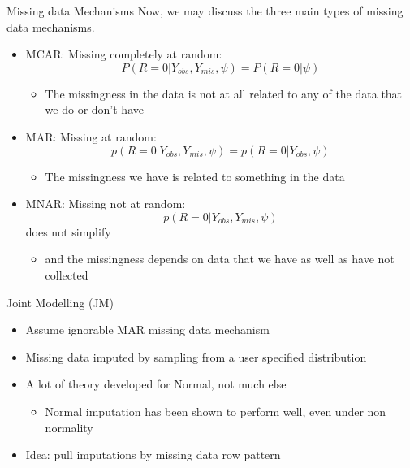 \begin{frame}{Missing data Mechanisms}
Now, we may discuss the three main types of missing data mechanisms. 
\begin{itemize}

\item MCAR: Missing completely at random:  $$P(R=0|Y_{obs},Y_{mis},\psi)=P(R=0|\psi)$$
\begin{itemize}
\item The missingness in the data is not at all related to any of the data that we do or don't have
\end{itemize}
\item MAR: Missing at random: $$p(R=0|Y_{obs},Y_{mis},\psi)= p(R=0|Y_{obs},\psi)$$
\begin{itemize}
 \item The missingness we have is related to something in the data 
\end{itemize}
\item MNAR: Missing not at random: $$p(R=0|Y_{obs},Y_{mis},\psi)$$ does not simplify
\begin{itemize}
 \item  and the missingness depends on data that we have as well as have not collected
\end{itemize}


\end{itemize}
 
\end{frame}

\begin{frame}{Joint Modelling (JM)}
 \begin{itemize}
  \item Assume ignorable MAR  missing data mechanism
  \item Missing data imputed by sampling from a user specified distribution
  \item A lot of theory developed for Normal, not much else
  \begin{itemize}
   \item Normal imputation has been shown to perform well, even under non normality \cite{Demirtas2008}
  \end{itemize}
\item Idea: pull imputations by missing data row pattern
 \end{itemize}

\end{frame}


